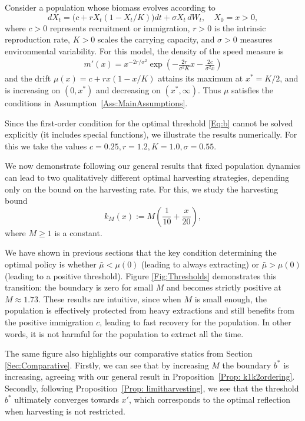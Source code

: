\documentclass[12pt]{article}
\begin{document}
Consider a population whose biomass evolves according to
\begin{equation*}
    dX_t = \big(c + rX_t(1-X_t/K)\big)dt + \sigma X_t\,dW_t, \quad X_0=x>0,
\end{equation*}
where $c>0$ represents recruitment or immigration, $r>0$ is the intrinsic reproduction rate, $K>0$ scales the carrying capacity, and $\sigma>0$ measures environmental variability. For this model, the density of the speed measure is
\begin{align*}
    m'(x) = x^{-2r /\sigma^2} \exp{\left( -\frac{2r}{\sigma^2 K}x - \frac{2c}{\sigma^2 x} \right)}
\end{align*}
and the drift $\mu(x)=c+r x(1-x/K)$ attains its maximum at $x^*=K/2$,
and is increasing on $(0,x^*)$ and decreasing on $(x^*,\infty)$. Thus $\mu$ satisfies the conditions in Assumption~\ref{Ass:MainAssumptions}.

Since the first-order condition for the optimal threshold \eqref{Eq:b} cannot be solved explicitly (it includes special functions), we illustrate the results numerically. For this we take the values $c=0.25, r=1.2, K=1.0, \sigma=0.55$.

We now demonstrate following our general results that fixed population dynamics can lead to two qualitatively different optimal harvesting strategies, depending only on the bound on the harvesting rate. For this, we study the harvesting bound
\begin{equation*}
    k_M(x):=M \left( \frac{1}{10} + \frac{x}{20} \right),
\end{equation*}
where $M \geq 1$ is a constant.

We have shown in previous sections that the key condition determining the optimal policy is whether $\bar{\mu} < \mu(0)$ (leading to always extracting) or $\bar{\mu} > \mu(0)$ (leading to a positive threshold). Figure \ref{Fig:Thresholds} demonstrates this transition: the boundary is zero for small $M$ and becomes strictly positive at $M \approx 1.73$. These results are intuitive, since when $M$ is small enough, the population is effectively protected from heavy extractions and still benefits from the positive immigration $c$, leading to fast recovery for the population. In other words, it is not harmful for the population to extract all the time.

The same figure also highlights our comparative statics from Section \ref{Sec:Comparative}. Firstly, we can see that by increasing $M$ the boundary $b^*$ is increasing, agreeing with our general result in Proposition~\ref{Prop: k1k2ordering}. Secondly, following Proposition~\ref{Prop: limitharvesting}, we see that the threshold $b^*$ ultimately converges towards $x'$, which corresponds to the optimal reflection when harvesting is not restricted.
\end{document}

